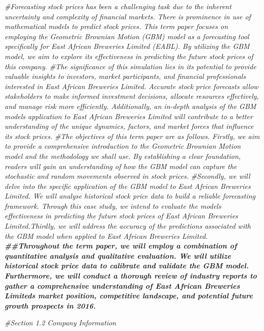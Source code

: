 \documentclass[
]{article}
\newenvironment{Shaded}{\begin{snugshade}}{\end{snugshade}}
\newcommand{\CommentTok}[1]{\textcolor[rgb]{0.56,0.35,0.01}{\textit{#1}}}
\newcommand{\DocumentationTok}[1]{\textcolor[rgb]{0.56,0.35,0.01}{\textbf{\textit{#1}}}}
\begin{document}
\begin{Shaded}
\begin{Highlighting}[]
\CommentTok{\#Forecasting stock prices has been a challenging task due to the inherent uncertainty and complexity of financial markets. There is prominence in use of mathematical models to predict stock prices. This term paper focuses on employing the Geometric Brownian Motion (GBM) model as a forecasting tool specifically for East African Breweries Limited (EABL). By utilizing the GBM model, we aim to explore its effectiveness in predicting the future stock prices of this company. }
\CommentTok{\#The significance of this simulation lies in its potential to provide valuable insights to investors, market participants, and financial professionals interested in East African Breweries Limited. Accurate stock price forecasts allow stakeholders to make informed investment decisions, allocate resources effectively, and manage risk more efficiently. Additionally, an in{-}depth analysis of the GBM model\textquotesingle{}s application to East African Breweries Limited will contribute to a better understanding of the unique dynamics, factors, and market forces that influence its stock prices.}
\CommentTok{\#The objectives of this term paper are as follows. Firstly, we aim to provide a comprehensive introduction to the Geometric Brownian Motion model and the methodology we shall use. By establishing a clear foundation, readers will gain an understanding of how the GBM model can capture the stochastic and random movements observed in stock prices.}
\CommentTok{\#Secondly, we will delve into the specific application of the GBM model to East African Breweries Limited. We will analyse historical stock price data to build a reliable forecasting framework. Through this case study, we intend to evaluate the model\textquotesingle{}s effectiveness in predicting the future stock prices of East African Breweries Limited.Thirdly, we will address the accuracy of the predictions associated with the GBM model when applied to East African Breweries Limited. }
\DocumentationTok{\#\#Throughout the term paper, we will employ a combination of quantitative analysis and qualitative evaluation. We will utilize historical stock price data to calibrate and validate the GBM model. Furthermore, we will conduct a thorough review of industry reports to gather a comprehensive understanding of East African Breweries Limited\textquotesingle{}s market position, competitive landscape, and potential future growth prospects in 2016.}

\CommentTok{\#Section 1.2 Company Information}


\end{Highlighting}
\end{Shaded}
\end{document}
